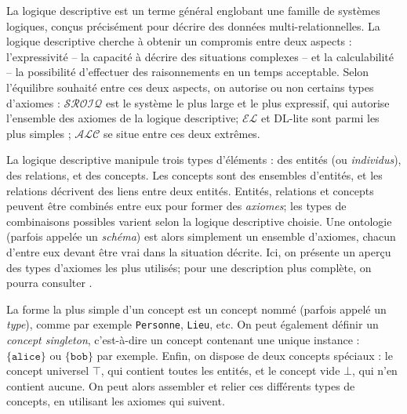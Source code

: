 La logique descriptive est un terme général englobant une famille de systèmes logiques, conçus précisément pour décrire des données multi-relationnelles. La logique descriptive cherche à obtenir un compromis entre deux aspects : l'expressivité – la capacité à décrire des situations complexes – et la calculabilité – la possibilité d'effectuer des raisonnements en un temps acceptable. Selon l'équilibre souhaité entre ces deux aspects, on autorise ou non certains types d'axiomes : $\mathcal{SROIQ}$ \cite{horrocks2006sroiq} est le système le plus large et le plus expressif, qui autorise l'ensemble des axiomes de la logique descriptive; $\mathcal{EL}$ et DL-lite sont parmi les plus simples \cite{krotzsch2012owl}; $\mathcal{ALC}$ se situe entre ces deux extrêmes.




La logique descriptive manipule trois types d'éléments : des entités (ou \textit{individus}), des relations, et des concepts. Les concepts sont des ensembles d'entités, et les relations décrivent des liens entre deux entités. Entités, relations et concepts peuvent être combinés entre eux pour former des \textit{axiomes}; les types de combinaisons possibles varient selon la logique descriptive choisie. Une ontologie (parfois appelée un \textit{schéma}) est alors simplement un ensemble d'axiomes, chacun d'entre eux devant être vrai dans la situation décrite.
Ici, on présente un aperçu des types d'axiomes les plus utilisés; %
pour une description plus complète, on pourra consulter \cite{krotzsch2013description}. %


La forme la plus simple d'un concept est un concept nommé (parfois appelé un \textit{type}), comme par exemple \texttt{Personne}, \texttt{Lieu}, etc. On peut également définir un \textit{concept singleton}, c'est-à-dire un concept contenant une unique instance : $\{ \texttt{alice} \}$ ou $\{ \texttt{bob} \}$ par exemple. Enfin, on dispose de deux concepts spéciaux : le concept universel $\top$, qui contient toutes les entités, et le concept vide $\bot$, qui n'en contient aucune. On peut alors assembler et relier ces différents types de concepts, en utilisant les axiomes qui suivent.

